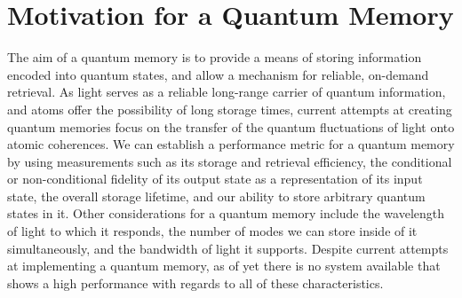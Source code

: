  




\chapter{Motivation for a Quantum Memory}
\label{ch:1} 

The aim of a quantum memory is to provide a means of storing information encoded into quantum states, and allow a mechanism for reliable, on-demand retrieval.  As light serves as a reliable long-range carrier of quantum information, and atoms offer the possibility of long storage times, current attempts at creating quantum memories focus on the transfer of the quantum fluctuations of light onto atomic coherences.  We can establish a performance metric for a quantum memory by using measurements such as its storage and retrieval efficiency, the conditional or non-conditional fidelity of its output state as a representation of its input state, the overall storage lifetime, and our ability to store arbitrary quantum states in it.  Other considerations for a quantum memory include the wavelength of light to which it responds, the number of modes we can store inside of it simultaneously, and the bandwidth of light it supports.  Despite current attempts at implementing a quantum memory, as of yet there is no system available that shows a high performance with regards to all of these characteristics.


